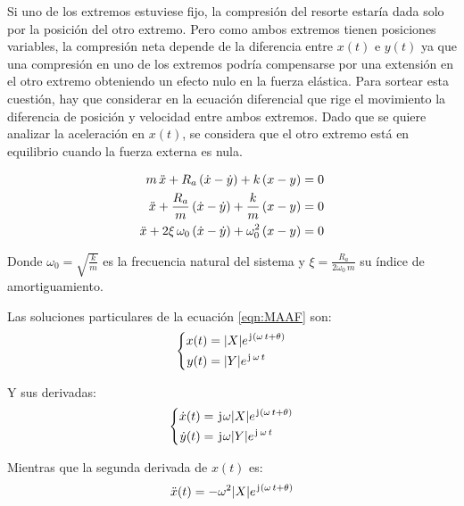 Si uno de los extremos estuviese fijo, la compresión del resorte estaría dada solo por la posición del otro extremo.
Pero como ambos extremos tienen posiciones variables, la compresión neta depende de la diferencia entre $x(t)$ e $y(t)$ ya que una compresión en uno de los extremos podría compensarse por una extensión en el otro extremo obteniendo un efecto nulo en la fuerza elástica.
Para sortear esta cuestión, hay que considerar en la ecuación diferencial que rige el movimiento la diferencia de posición y velocidad entre ambos extremos.
Dado que se quiere analizar la aceleración en $x(t)$, se considera que el otro extremo está en equilibrio cuando la fuerza externa es nula.

\begin{align}
    m\,\Ddot{x} + R_a \left( \Dot{x}-\Dot{y} \right) + k \left( x-y \right) &= 0
    \notag
    \\
    \Ddot{x} + \frac{R_a}{m} \left( \Dot{x}-\Dot{y} \right) + \frac{k}{m} \left( x-y \right) &= 0
    \notag
    \\
    \Ddot{x}+2\xi\,\omega_0\left(\Dot{x}-\Dot{y}\right) + \omega_0^2 \left( x-y \right) &= 0
    \label{eqn:MAAF}
\end{align}

Donde $\omega_0=\sqrt{\frac{k}{m}}$ es la frecuencia natural del sistema y $\xi=\tfrac{R_a}{2\omega_0\,m}$ su índice de amortiguamiento.

Las soluciones particulares de la ecuación \ref{eqn:MAAF} son:
\begin{equation*}
    \left\{
    \begin{aligned}
        x(t) &= {\left| {X} \right|} e^{\mkern2mu\mathrm{j}\mkern1mu (\omega \, t + \theta)}
        \\
        y(t) &= {\left| {Y} \right|} e^{\mkern2mu\mathrm{j}\mkern1mu \, \omega \, t}
    \end{aligned}
    \right.
\end{equation*}

Y sus derivadas:
\begin{equation*}
    \left\{
    \begin{aligned}
        \Dot{x}(t) &= \mkern2mu\mathrm{j}\mkern1mu \omega {\left| {X} \right|} e^{\mkern2mu\mathrm{j}\mkern1mu (\omega \, t + \theta)}
        \\
        \Dot{y}(t) &= \mkern2mu\mathrm{j}\mkern1mu \omega {\left| {Y} \right|} e^{\mkern2mu\mathrm{j}\mkern1mu \, \omega \, t}
    \end{aligned}
    \right.
\end{equation*}

Mientras que la segunda derivada de $x(t)$ es:
\begin{equation*}
    \Ddot{x}(t) = -\omega^2 {\left| {X} \right|} e^{\mkern2mu\mathrm{j}\mkern1mu (\omega \, t + \theta)}
\end{equation*}

